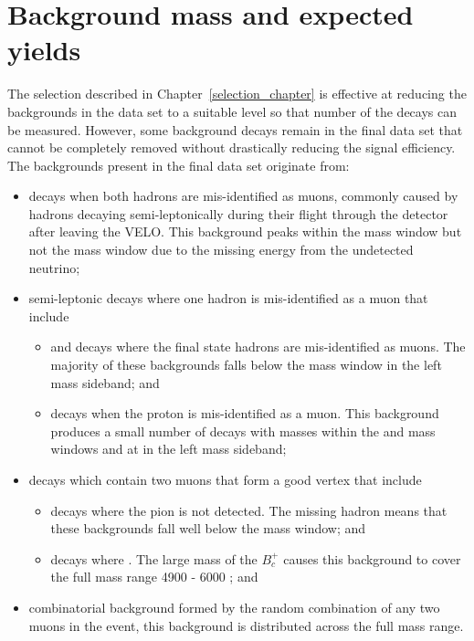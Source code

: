 
\section{Background mass \pdfs and expected yields}
\label{sec:backgrounds}
The selection described in Chapter~\ref{selection_chapter} is effective at reducing the backgrounds in the data set to a suitable level so that number of the \bmumu decays can be measured. However, some background decays remain in the final data set that cannot be completely removed without drastically reducing the signal efficiency. %
The backgrounds present in the final data set originate from:
\begin{itemize}
\item \bhh decays when both hadrons are mis-identified as muons, commonly caused by hadrons decaying semi-leptonically during their flight through the detector after leaving the VELO. This background peaks within the \bd mass window but not the \bs mass window due to the missing energy from the undetected neutrino;
\item semi-leptonic decays where one hadron is mis-identified as a muon that include
\begin{itemize}
\item \bdpimunu and \bsKmunu decays where the final state hadrons are mis-identified as muons. The majority of these backgrounds falls below the \bd mass window in the left mass sideband; and
\item \lambdab decays when the proton is mis-identified as a muon. This background produces a small number of decays with masses within the \bs and \bd mass windows and at in the left mass sideband;
\end{itemize}
\item decays which contain two muons that form a good vertex that include
\begin{itemize}
\item \bpimumu decays where the pion is not detected. The missing hadron means that these backgrounds fall well below the \bd mass window; and
\item \bcjpsimunu decays where \jpsimumu. The large mass of the $B^{+}_{c}$ causes this background to cover the full mass range 4900 - 6000 \mevcc; and
\end{itemize}
\item combinatorial background formed by the random combination of any two muons in the event, this background is distributed across the full mass range.
\end{itemize}

